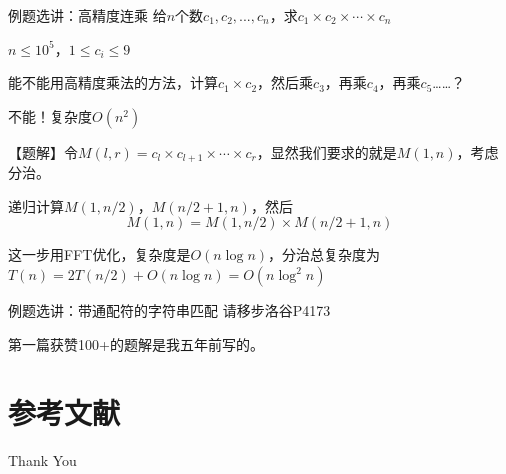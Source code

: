 \documentclass{beamer}
\begin{document}
\begin{frame}{例题选讲：高精度连乘}
    \small
    给$n$个数$c_1,c_2,...,c_n$，求$c_1\times c_2\times \cdots \times c_n$

    $n\leq 10^5$，$1\leq c_i\leq 9$

    \pause\vspace{1em}
    能不能用高精度乘法的方法，计算$c_1\times c_2$，然后乘$c_3$，再乘$c_4$，再乘$c_5$……？

    \pause\vspace{.5em}
    不能！复杂度$O(n^2)$

    \pause\vspace{.5em}
    【题解】令$M(l,r)=c_l\times c_{l+1}\times \cdots \times c_r$，显然我们要求的就是$M(1,n)$，考虑分治。

    \pause
    递归计算$M(1,n/2)$，$M(n/2+1,n)$，然后
    \begin{equation*}
        M(1,n)=M(1,n/2) \times M(n/2+1,n)
    \end{equation*}

    这一步用FFT优化，复杂度是$O(n\log n)$，分治总复杂度为$T(n)=2T(n/2)+O(n\log n)=O(n\log^2 n)$
\end{frame}

\begin{frame}{例题选讲：带通配符的字符串匹配}
    请移步洛谷P4173

    第一篇获赞100+的题解是我五年前写的。
\end{frame}

\section{参考文献}

\begin{frame}[allowframebreaks]
    
    
    \nocite{*} %
\end{frame}


\begin{frame}
    \begin{center}
        {\Huge\calligra Thank You}
    \end{center}
\end{frame}
\end{document}
